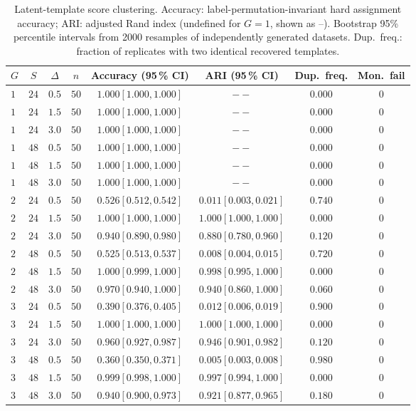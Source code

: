 \begin{table}[!htbp]
\centering
\small
\caption{Latent-template score clustering. Accuracy: label-permutation-invariant hard assignment accuracy; ARI: adjusted Rand index (undefined for $G=1$, shown as --). Bootstrap 95\% percentile intervals from 2000 resamples of independently generated datasets. Dup.\ freq.: fraction of replicates with two identical recovered templates.}
\label{tab:E05-latent}
\begin{tabular}{@{}lccccccc@{}}
\toprule
$G$ & $S$ & $\Delta$ & $n$ & Accuracy (95\,\% CI) & ARI (95\,\% CI) & Dup.\ freq. & Mon.\ fail \\
\midrule
$1$ & $24$ & $0.5$ & $50$ & $1.000 [1.000,1.000]$ & $--$ & $0.000$ & $0$ \\
$1$ & $24$ & $1.5$ & $50$ & $1.000 [1.000,1.000]$ & $--$ & $0.000$ & $0$ \\
$1$ & $24$ & $3.0$ & $50$ & $1.000 [1.000,1.000]$ & $--$ & $0.000$ & $0$ \\
$1$ & $48$ & $0.5$ & $50$ & $1.000 [1.000,1.000]$ & $--$ & $0.000$ & $0$ \\
$1$ & $48$ & $1.5$ & $50$ & $1.000 [1.000,1.000]$ & $--$ & $0.000$ & $0$ \\
$1$ & $48$ & $3.0$ & $50$ & $1.000 [1.000,1.000]$ & $--$ & $0.000$ & $0$ \\
$2$ & $24$ & $0.5$ & $50$ & $0.526 [0.512,0.542]$ & $0.011 [0.003,0.021]$ & $0.740$ & $0$ \\
$2$ & $24$ & $1.5$ & $50$ & $1.000 [1.000,1.000]$ & $1.000 [1.000,1.000]$ & $0.000$ & $0$ \\
$2$ & $24$ & $3.0$ & $50$ & $0.940 [0.890,0.980]$ & $0.880 [0.780,0.960]$ & $0.120$ & $0$ \\
$2$ & $48$ & $0.5$ & $50$ & $0.525 [0.513,0.537]$ & $0.008 [0.004,0.015]$ & $0.720$ & $0$ \\
$2$ & $48$ & $1.5$ & $50$ & $1.000 [0.999,1.000]$ & $0.998 [0.995,1.000]$ & $0.000$ & $0$ \\
$2$ & $48$ & $3.0$ & $50$ & $0.970 [0.940,1.000]$ & $0.940 [0.860,1.000]$ & $0.060$ & $0$ \\
$3$ & $24$ & $0.5$ & $50$ & $0.390 [0.376,0.405]$ & $0.012 [0.006,0.019]$ & $0.900$ & $0$ \\
$3$ & $24$ & $1.5$ & $50$ & $1.000 [1.000,1.000]$ & $1.000 [1.000,1.000]$ & $0.000$ & $0$ \\
$3$ & $24$ & $3.0$ & $50$ & $0.960 [0.927,0.987]$ & $0.946 [0.901,0.982]$ & $0.120$ & $0$ \\
$3$ & $48$ & $0.5$ & $50$ & $0.360 [0.350,0.371]$ & $0.005 [0.003,0.008]$ & $0.980$ & $0$ \\
$3$ & $48$ & $1.5$ & $50$ & $0.999 [0.998,1.000]$ & $0.997 [0.994,1.000]$ & $0.000$ & $0$ \\
$3$ & $48$ & $3.0$ & $50$ & $0.940 [0.900,0.973]$ & $0.921 [0.877,0.965]$ & $0.180$ & $0$ \\
\bottomrule
\end{tabular}
\end{table}
